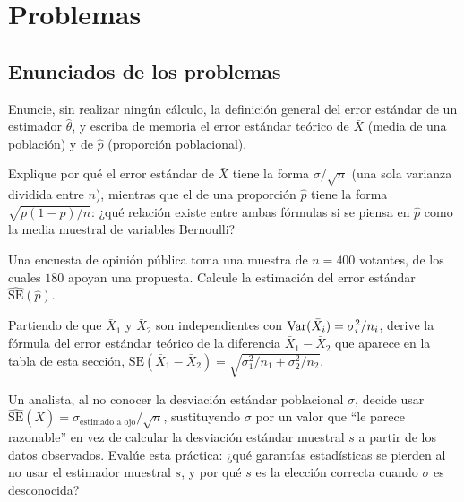 \section*{Problemas}

\subsection*{Enunciados de los problemas}

\begin{problema}
	\label{prob:395183d}
	Enuncie, sin realizar ningún cálculo, la definición general del error estándar de un estimador $\hat\theta$, y escriba de memoria el error estándar teórico de $\bar X$ (media de una población) y de $\hat p$ (proporción poblacional).
\end{problema}

\begin{problema}
	\label{prob:8a98763}
	Explique por qué el error estándar de $\bar X$ tiene la forma $\sigma/\sqrt n$ (una sola varianza dividida entre $n$), mientras que el de una proporción $\hat p$ tiene la forma $\sqrt{p(1-p)/n}$: ¿qué relación existe entre ambas fórmulas si se piensa en $\hat p$ como la media muestral de variables Bernoulli?
\end{problema}

\begin{problema}
	\label{prob:0d972a2}
	Una encuesta de opinión pública toma una muestra de $n=400$ votantes, de los cuales $180$ apoyan una propuesta. Calcule la estimación del error estándar $\widehat{\text{SE}}(\hat p)$.
\end{problema}

\begin{problema}
	\label{prob:a48a78a}
	Partiendo de que $\bar X_1$ y $\bar X_2$ son independientes con $\operatorname{Var}(\bar X_i)=\sigma_i^2/n_i$, derive la fórmula del error estándar teórico de la diferencia $\bar X_1-\bar X_2$ que aparece en la tabla de esta sección, $\text{SE}(\bar X_1-\bar X_2)=\sqrt{\sigma_1^2/n_1+\sigma_2^2/n_2}$.
\end{problema}

\begin{problema}
	\label{prob:acdadd3}
	Un analista, al no conocer la desviación estándar poblacional $\sigma$, decide usar $\widehat{\text{SE}}(\bar X) = \sigma_{\text{estimado a ojo}}/\sqrt n$, sustituyendo $\sigma$ por un valor que ``le parece razonable'' en vez de calcular la desviación estándar muestral $s$ a partir de los datos observados. Evalúe esta práctica: ¿qué garantías estadísticas se pierden al no usar el estimador muestral $s$, y por qué $s$ es la elección correcta cuando $\sigma$ es desconocida?
\end{problema}

